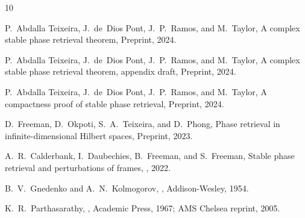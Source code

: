 \documentclass[11pt]{amsart}
\begin{document}

\begin{thebibliography}{10}

P.~Abdalla Teixeira, J.~de~Dios Pont, J.~P.~Ramos, and M.~Taylor,
\newblock A complex stable phase retrieval theorem,
\newblock Preprint, 2024.

P.~Abdalla Teixeira, J.~de~Dios Pont, J.~P.~Ramos, and M.~Taylor,
\newblock A complex stable phase retrieval theorem, appendix draft,
\newblock Preprint, 2024.

P.~Abdalla Teixeira, J.~de~Dios Pont, J.~P.~Ramos, and M.~Taylor,
\newblock A compactness proof of stable phase retrieval,
\newblock Preprint, 2024.

D.~Freeman, D.~Okpoti, S.~A.~Teixeira, and D.~Phong,
\newblock Phase retrieval in infinite-dimensional Hilbert spaces,
\newblock Preprint, 2023.

A.~R.~Calderbank, I.~Daubechies, B.~Freeman, and S.~Freeman,
\newblock Stable phase retrieval and perturbations of frames,
, 2022.

B.~V.~Gnedenko and A.~N.~Kolmogorov,
,
\newblock Addison-Wesley, 1954.

K.~R.~Parthasarathy,
,
\newblock Academic Press, 1967; AMS Chelsea reprint, 2005.

\end{thebibliography}
\end{document}

